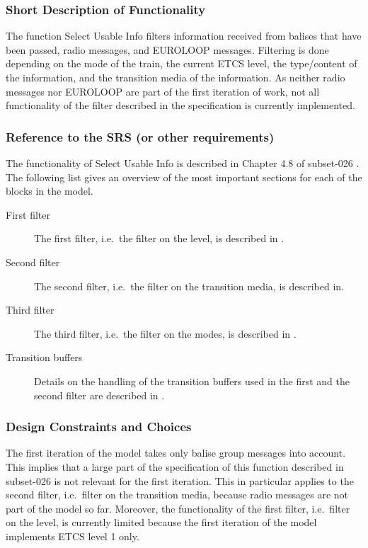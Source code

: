 \documentclass{template/openetcs_report}
\begin{document}
\subsubsection{Short Description of Functionality}
The function Select Usable Info filters information received from balises that have been passed, radio messages, and EUROLOOP messages. Filtering is done depending on the mode of the train, the current ETCS level, the type/content of the information, and the transition media of the information. As neither radio messages nor EUROLOOP are part of the first iteration of work, not all functionality of the filter described in the specification is currently implemented.

\subsubsection{Reference to the SRS (or other requirements)}
The functionality of Select Usable Info is described in Chapter 4.8 of subset-026 \cite{subset-026}. The following list gives an overview of the most important sections for each of the blocks in the model.

\begin{description}
\item[First filter] The first filter, i.e.~the filter on the level, is described in \cite[Chapter~4.8.3]{subset-026}.
\item[Second filter] The second filter, i.e.~the filter on the transition media, is described in\cite[Chapter~4.8.3]{subset-026}.
\item[Third filter]
 The third filter, i.e.~the filter on the modes, is described in \cite[Chapter~4.8.4]{subset-026}.
\item[Transition buffers] Details on the handling of the transition buffers used in the first and the second filter are described in \cite[Chapter~4.8.5]{subset-026}.
\end{description}

\subsubsection{Design Constraints and Choices}
The first iteration of the model takes only balise group messages into account. This implies that a large part of the specification of this function described in subset-026 \cite{subset-026} is not relevant for the first iteration. This in particular applies to the second filter, i.e.~filter on the transition media, because radio messages are not part of the model so far. Moreover, the functionality of the first filter, i.e.~filter on the level, is currently  limited because the first iteration of the model implements ETCS level 1 only.
\end{document}
